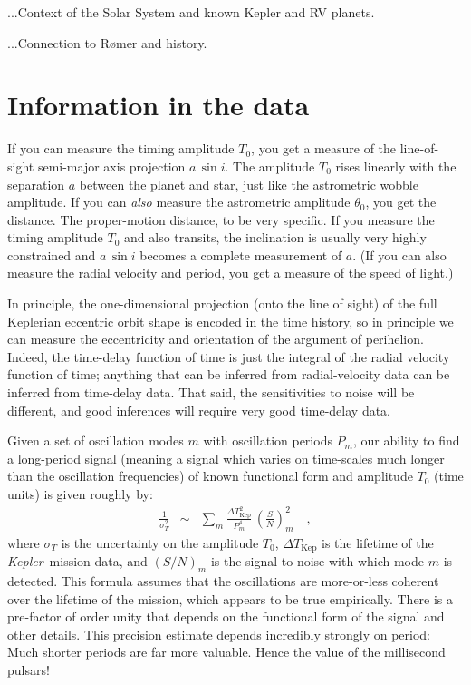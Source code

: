 \documentclass[12pt, preprint]{aastex}
\newcommand{\project}[1]{\textsl{#1}}
\newcommand{\Kepler}{\project{Kepler}}
\newcommand{\DeltaTKepler}{\Delta T_{\mathrm{Kep}}}
\begin{document}
...Context of the Solar System and known Kepler and RV planets.

...Connection to R\o mer and history.

\section{Information in the data}

If you can measure the timing amplitude $T_0$, you get a measure of
the line-of-sight semi-major axis projection $a\,\sin i$.
The amplitude $T_0$ rises linearly with the separation $a$ between the
planet and star, just like the astrometric wobble amplitude.
If you can \emph{also} measure the astrometric amplitude $\theta_0$,
you get the distance.
The proper-motion distance, to be very specific.
If you measure the timing amplitude $T_0$ and also transits, the
inclination is usually very highly constrained and $a\,\sin i$ becomes
a complete measurement of $a$.
(If you can also measure the radial velocity and period, you get a
measure of the speed of light.)

In principle, the one-dimensional projection (onto the line of sight)
of the full Keplerian eccentric orbit shape is encoded in the time
history, so in principle we can measure the eccentricity and
orientation of the argument of perihelion.
Indeed, the time-delay function of time is just the integral of the
radial velocity function of time; anything that can be inferred from
radial-velocity data can be inferred from time-delay data.
That said, the sensitivities to noise will be different, and good
inferences will require very good time-delay data.

Given a set of oscillation modes $m$ with oscillation periods $P_m$,
our ability to find a long-period signal (meaning a signal which
varies on time-scales much longer than the oscillation frequencies) of
known functional form and amplitude $T_0$ (time units) is given
roughly by:
\begin{eqnarray}
\frac{1}{\sigma_T^2} &\sim& \sum_m \frac{\DeltaTKepler^2}{P_m^4}\,\left(\frac{S}{N}\right)_m^2
\quad ,
\end{eqnarray}
where $\sigma_T$ is the uncertainty on the amplitude $T_0$,
$\DeltaTKepler$ is the lifetime of the \Kepler\ mission data, and
$(S/N)_m$ is the signal-to-noise with which mode $m$ is detected.
This formula assumes that the oscillations are more-or-less coherent
over the lifetime of the mission, which appears to be true
empirically.
There is a pre-factor of order unity that depends on the functional
form of the signal and other details.
This precision estimate depends incredibly strongly on period:
Much shorter periods are far more valuable.
Hence the value of the millisecond pulsars!
\end{document}
